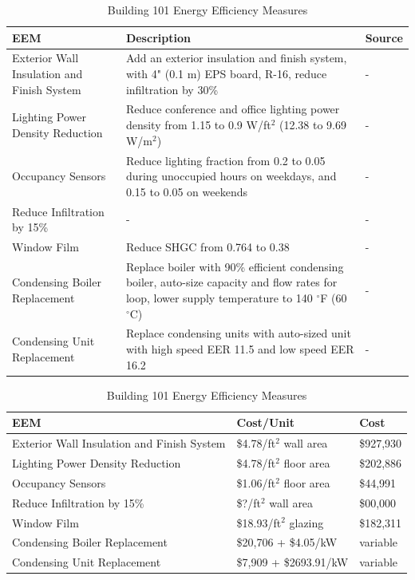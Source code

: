 \documentclass[review]{elsarticle}
\begin{document}
\begin{table}[h]
	\centering
	\begin{tabular}{|p{3cm}|p{8cm}|p{1cm}|}
		\hline
		\textbf{EEM} & \textbf{Description} & \textbf{Source} \\
		\hline
		Exterior Wall Insulation and Finish System & Add an exterior insulation and finish system, with 4" (0.1 m) EPS board, R-16, reduce infiltration by 30\% & - \\
		\hline
		Lighting Power Density Reduction & Reduce conference and office lighting power density from 1.15 to 0.9 W/ft$^2$ (12.38 to 9.69 W/m$^2$) & - \\
		\hline
		Occupancy Sensors & Reduce lighting fraction from 0.2 to 0.05 during unoccupied hours on weekdays, and 0.15 to 0.05 on weekends & - \\
		\hline
		Reduce Infiltration by 15\% & - & - \\
		\hline
		Window Film & Reduce SHGC from 0.764 to 0.38 & - \\
		\hline
		Condensing Boiler Replacement & Replace boiler with 90\% efficient condensing boiler, auto-size capacity and flow rates for loop, lower supply temperature to 140 $^{\circ}$F (60 $^{\circ}$C) & - \\
		\hline
		Condensing Unit Replacement & Replace condensing units with auto-sized unit with high speed EER 11.5 and low speed EER 16.2 & - \\
		\hline
	\end{tabular}
	\caption{Building 101 Energy Efficiency Measures}
	\label{measures}
\end{table}

\begin{table}[h]
	\centering
	\begin{tabular}{l l l}
		\hline
		\textbf{EEM} & \textbf{Cost/Unit} & \textbf{Cost} \\
		\hline
		Exterior Wall Insulation and Finish System & \$4.78/ft$^2$ wall area & \$927,930 \\
		Lighting Power Density Reduction & \$4.78/ft$^2$ floor area & \$202,886\\
		Occupancy Sensors & \$1.06/ft$^2$ floor area & \$44,991 \\
		Reduce Infiltration by 15\% & \$?/ft$^2$ wall area& \$00,000 \\
		Window Film & \$18.93/ft$^2$ glazing & \$182,311 \\
		Condensing Boiler Replacement & \$20,706 + \$4.05/kW & variable \\
		Condensing Unit Replacement & \$7,909 + \$2693.91/kW & variable \\
		\hline
	\end{tabular}
	\caption{Building 101 Energy Efficiency Measures}
	\label{measures_cost}
\end{table}
\end{document}

